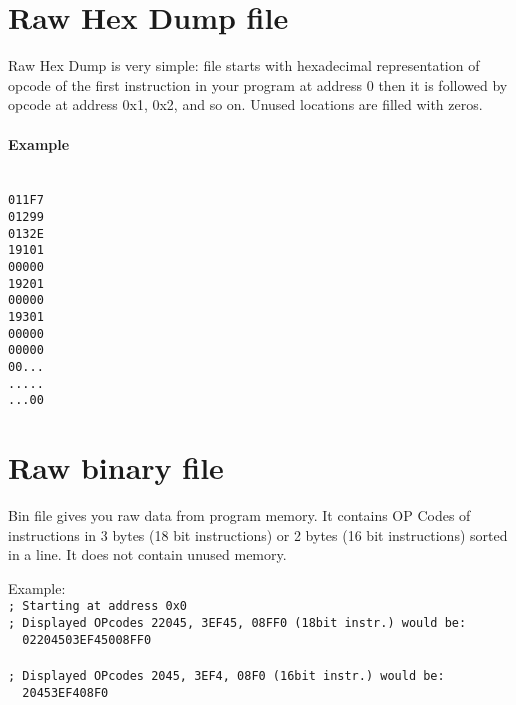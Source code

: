 \clearpage
\section{Raw Hex Dump file}
    Raw Hex Dump is very simple: file starts with hexadecimal representation of opcode of the first instruction in your program at address 0 then it is followed by opcode at address 0x1, 0x2, and so on. Unused locations are filled with zeros.

    \paragraph{Example}
        ~\\
        \verb'011F7'\\
        \verb'01299'\\
        \verb'0132E'\\
        \verb'19101'\\
        \verb'00000'\\
        \verb'19201'\\
        \verb'00000'\\
        \verb'19301'\\
        \verb'00000'\\
        \verb'00000'\\
        \verb'00...'\\
        \verb'.....'\\
        \verb'...00'\\

\section{Raw binary file}
    Bin file gives you raw data from program memory. It contains OP Codes of instructions in 3 bytes (18 bit instructions) or 2 bytes (16 bit instructions) sorted in a line. It does not contain unused memory.

    Example:\\
    {
        \usecodefont
        \verb'; Starting at address 0x0'\\
        \verb'; Displayed OPcodes 22045, 3EF45, 08FF0 (18bit instr.) would be:'\\
        \verb'  02204503EF45008FF0 '\\\\
        \verb'; Displayed OPcodes 2045, 3EF4, 08F0 (16bit instr.) would be:'\\
        \verb'  20453EF408F0 '\\
    }

